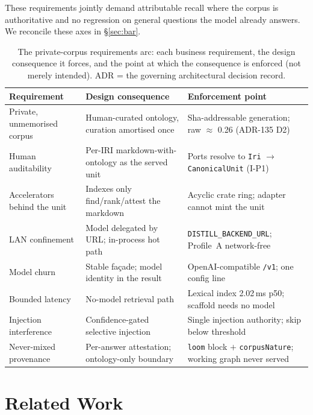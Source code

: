 \documentclass[10pt,twocolumn]{article}
\begin{document}
These requirements jointly demand attributable recall where the corpus is authoritative and no regression on general questions the model already answers. We reconcile these axes in \S\ref{sec:bar}.

\begin{table}[t]\centering\small
\caption{The private-corpus requirements arc: each business requirement, the design consequence it
forces, and the point at which the consequence is enforced (not merely intended). ADR = the
governing architectural decision record.}
\label{tab:req}
\renewcommand{\arraystretch}{1.15}
\begin{tabularx}{\textwidth}{@{}>{\raggedright\arraybackslash}p{3.4cm} >{\raggedright\arraybackslash}X >{\raggedright\arraybackslash}p{4.3cm}@{}}
\toprule
Requirement & Design consequence & Enforcement point \\
\midrule
Private, unmemorised corpus & Human-curated ontology, curation amortised once & Sha-addressable generation; raw $\approx$ 0.26 (ADR-135 D2) \\
Human auditability & Per-IRI markdown-with-ontology as the served unit & Ports resolve to \texttt{Iri} $\to$ \texttt{CanonicalUnit} (I-P1) \\
Accelerators behind the unit & Indexes only find/rank/attest the markdown & Acyclic crate ring; adapter cannot mint the unit \\
LAN confinement & Model delegated by URL; in-process hot path & \texttt{DISTILL\_BACKEND\_URL}; Profile~A network-free \\
Model churn & Stable façade; model identity in the result & OpenAI-compatible \texttt{/v1}; one config line \\
Bounded latency & No-model retrieval path & Lexical index 2.02\,ms p50; scaffold needs no model \\
Injection interference & Confidence-gated selective injection & Single injection authority; skip below threshold \\
Never-mixed provenance & Per-answer attestation; ontology-only boundary & \texttt{loom} block $+$ \texttt{corpusNature}; working graph never served \\
\bottomrule
\end{tabularx}
\end{table}


\section{Related Work}\label{sec:related}
\end{document}
